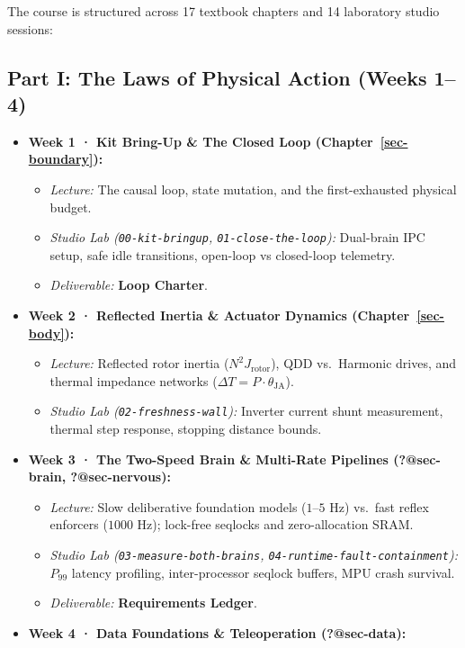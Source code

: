 \documentclass[
  9pt,
  letterpaper,
  open=right,
  numbers=noenddot,
  captions=tableheading]{scrbook}
\makeatletter
\providecommand{\tightlist}{%
  \setlength{\itemsep}{0pt}\setlength{\parskip}{0pt}}
\def\tightlist{}
\let\tightlist\relax
\newif\ifmlsys@inside@longtable
\newif\ifmlsys@longtable@numbered
\let\mlsys@orig@label\label
\renewcommand{\label}[1]{%
  \ifmlsys@inside@longtable
    \global\mlsys@longtable@numberedtrue
  \fi
  \mlsys@orig@label{#1}%
}
\let\label\mlsys@orig@label
\makeatother
\begin{document}

The course is structured across 17 textbook chapters and 14 laboratory
studio sessions:

\subsection*{Part I: The Laws of Physical Action (Weeks
1--4)}\label{part-i-the-laws-of-physical-action-weeks-14}

\begin{itemize}
\tightlist
\item
  \textbf{Week 1 · Kit Bring-Up \& The Closed Loop
  (Chapter~\ref{sec-boundary}):}

  \begin{itemize}
  \tightlist
  \item
    \emph{Lecture:} The causal loop, state mutation, and the
    first-exhausted physical budget.
  \item
    \emph{Studio Lab (\texttt{00-kit-bringup},
    \texttt{01-close-the-loop}):} Dual-brain IPC setup, safe idle
    transitions, open-loop vs closed-loop telemetry.
  \item
    \emph{Deliverable:} \textbf{Loop Charter}.
  \end{itemize}
\item
  \textbf{Week 2 · Reflected Inertia \& Actuator Dynamics
  (Chapter~\ref{sec-body}):}

  \begin{itemize}
  \tightlist
  \item
    \emph{Lecture:} Reflected rotor inertia (\(N^2 J_{\text{rotor}}\)),
    QDD vs.~Harmonic drives, and thermal impedance networks
    (\(\Delta T = P \cdot \theta_{\text{JA}}\)).
  \item
    \emph{Studio Lab (\texttt{02-freshness-wall}):} Inverter current
    shunt measurement, thermal step response, stopping distance bounds.
  \end{itemize}
\item
  \textbf{Week 3 · The Two-Speed Brain \& Multi-Rate Pipelines
  (\textbf{?@sec-brain}, \textbf{?@sec-nervous}):}

  \begin{itemize}
  \tightlist
  \item
    \emph{Lecture:} Slow deliberative foundation models
    (\(1\text{--}5\text{ Hz}\)) vs.~fast reflex enforcers
    (\(1000\text{ Hz}\)); lock-free seqlocks and zero-allocation SRAM.
  \item
    \emph{Studio Lab (\texttt{03-measure-both-brains},
    \texttt{04-runtime-fault-containment}):} \(P_{99}\) latency
    profiling, inter-processor seqlock buffers, MPU crash survival.
  \item
    \emph{Deliverable:} \textbf{Requirements Ledger}.
  \end{itemize}
\item
  \textbf{Week 4 · Data Foundations \& Teleoperation
  (\textbf{?@sec-data}):}


\end{itemize}
\end{document}

